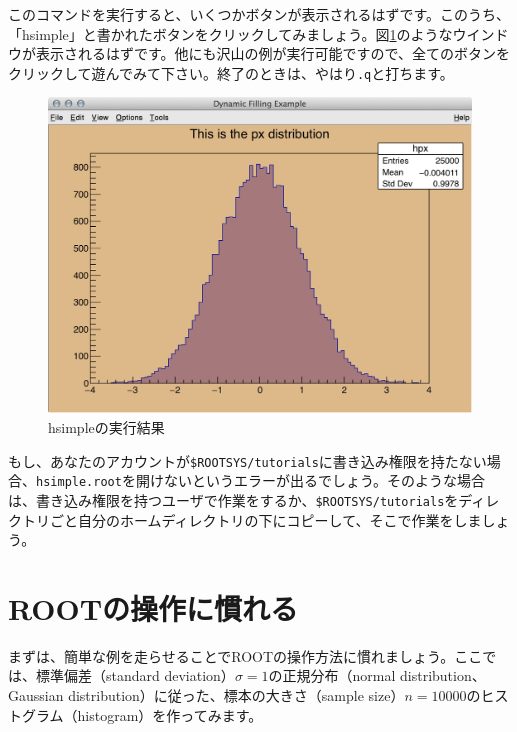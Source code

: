 このコマンドを実行すると、いくつかボタンが表示されるはずです。このうち、「hsimple」と書かれたボタンをクリックしてみましょう。図\ref{fig_hsimple}のようなウインドウが表示されるはずです。他にも沢山の例が実行可能ですので、全てのボタンをクリックして遊んでみて下さい。終了のときは、やはり\texttt{.q}と打ちます。

\begin{figure}
  \centering
  \includegraphics[width=12cm,bb= 0 0 1400 1044]{fig/hsimple.png}
  \caption{hsimpleの実行結果}
  \label{fig_hsimple}
\end{figure}

もし、あなたのアカウントが\texttt{\$ROOTSYS/tutorials}に書き込み権限を持たない場合、\texttt{hsimple.root}を開けないというエラーが出るでしょう。そのような場合は、書き込み権限を持つユーザで作業をするか、\texttt{\$ROOTSYS/tutorials}をディレクトリごと自分のホームディレクトリの下にコピーして、そこで作業をしましょう。

\section{ROOTの操作に慣れる}

まずは、簡単な例を走らせることでROOTの操作方法に慣れましょう。ここでは、標準偏差（standard deviation）$\sigma=1$の正規分布（normal distribution、Gaussian distribution）に従った、標本の大きさ（sample size）$n=10000$のヒストグラム（histogram）を作ってみます。

